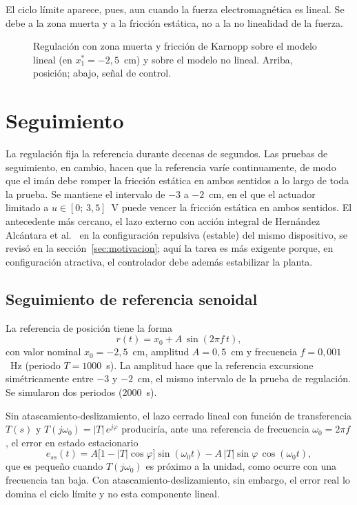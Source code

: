 El ciclo límite aparece, pues, aun cuando la fuerza electromagnética es lineal. Se debe a la zona muerta y a la fricción estática, no a la no linealidad de la fuerza.

\begin{figure}[ht]
    \centering
    
    \caption[Modelo lineal con atascamiento-deslizamiento]{Regulación con zona muerta y fricción de Karnopp sobre el modelo lineal (en $x_1^*=-2{,}5$~cm) y sobre el modelo no lineal. Arriba, posición; abajo, señal de control.}
    \label{fig:p8_lineal_ad}
\end{figure}

\FloatBarrier

\section{Seguimiento}

La regulación fija la referencia durante decenas de segundos. Las pruebas de seguimiento, en cambio, hacen que la referencia varíe continuamente, de modo que el imán debe romper la fricción estática en ambos sentidos a lo largo de toda la prueba. Se mantiene el intervalo de $-3$ a $-2$~cm, en el que el actuador limitado a $u\in[0;\,3{,}5]$~V puede vencer la fricción estática en ambos sentidos. El antecedente más cercano, el lazo externo con acción integral de Hernández Alcántara et al.~\cite{alcantara} en la configuración repulsiva (estable) del mismo dispositivo, se revisó en la sección~\ref{sec:motivacion}; aquí la tarea es más exigente porque, en configuración atractiva, el controlador debe además estabilizar la planta.

\subsection{Seguimiento de referencia senoidal}

La referencia de posición tiene la forma
\begin{equation}
  r(t) = x_0 + A\,\sin(2\pi f\, t) ,
  \label{eq:ref_senoidal}
\end{equation}
con valor nominal $x_0 = -2{,}5$~cm, amplitud $A = 0{,}5$~cm y frecuencia $f = 0{,}001$~Hz (periodo $T = 1000$~s). La amplitud hace que la referencia excursione simétricamente entre $-3$ y $-2$~cm, el mismo intervalo de la prueba de regulación. Se simularon dos periodos (2000~s).

Sin atascamiento-deslizamiento, el lazo cerrado lineal con función de transferencia $T(s)$ y $T(j\omega_0)=|T|\,e^{j\varphi}$ produciría, ante una referencia de frecuencia $\omega_0 = 2\pi f$, el error en estado estacionario
\begin{equation}
  e_{ss}(t) = A\bigl[1 - |T|\cos\varphi\bigr]\sin(\omega_0 t)
              - A\,|T|\sin\varphi\,\cos(\omega_0 t) ,
  \label{eq:ess_senoidal}
\end{equation}
que es pequeño cuando $T(j\omega_0)$ es próximo a la unidad, como ocurre con una frecuencia tan baja. Con atascamiento-deslizamiento, sin embargo, el error real lo domina el ciclo límite y no esta componente lineal.

